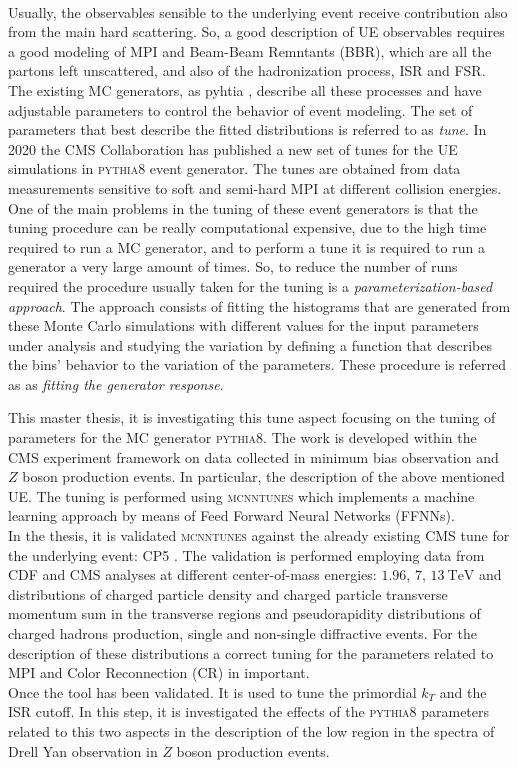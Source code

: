 \\
Usually, the observables sensible to the underlying event receive contribution also from the main hard scattering. So, a good  description of UE observables requires a good modeling of MPI and Beam-Beam Remntants (BBR), which are all the partons left unscattered, and also of the hadronization process, ISR and FSR. The existing MC generators, as pyhtia \cite{PYTHIA2015}, describe all these processes and have adjustable parameters to control the behavior of event modeling. The set of parameters that best describe the fitted distributions is referred to as \textit{tune}. 
In 2020 the CMS Collaboration has published a new set of tunes for the UE simulations \cite{CPtunes} in \textsc{pythia8} event generator. The tunes are obtained from data measurements sensitive to soft and semi-hard MPI at different collision energies. 
\\
One of the main problems in the tuning of these event generators is that the tuning procedure can be really computational expensive, due to the high time required to run a MC generator, and to perform a tune it is required to run a generator a very large amount of times. So, to reduce the number of runs required the procedure usually taken for the tuning is a \textit{parameterization-based approach}. The approach consists of fitting the histograms that are generated from these Monte Carlo simulations with different values for the input parameters under analysis and studying the variation by  defining a function that describes the bins' behavior to the variation of the parameters. These procedure is referred as as \textit{fitting the generator response}.

\medskip

This master thesis, it is investigating this tune aspect focusing on the tuning of parameters for the MC generator \textsc{pythia8}. The work is developed within the CMS experiment framework on data collected in minimum bias observation and $Z$ boson production events. In particular, the description of the above mentioned UE. The tuning is performed using \textsc{mcnntunes} \cite{MCNNTUNESarticle} which implements a machine learning approach by means of Feed Forward Neural Networks (FFNNs).
\\
In the thesis, it is validated \textsc{mcnntunes} against the already existing CMS tune for the underlying event: CP5 \cite{CPtunes}. The validation is performed employing data from CDF and CMS analyses at different center-of-mass energies: $1.96$, $7$, $13\ \mathrm{TeV}$ and distributions of charged particle density and charged particle transverse momentum  sum in the transverse regions and pseudorapidity distributions of charged hadrons production, single and non-single diffractive events. For the description of these distributions a correct  tuning for the parameters related to MPI and Color Reconnection (CR) in important. 
\\
Once the tool has been validated. It is used to tune the primordial $k_T$ and the ISR cutoff. In this step, it is investigated the effects of the \textsc{pythia8} parameters related to this two aspects in the description of the low region in the spectra of Drell Yan observation in $Z$ boson production events.




